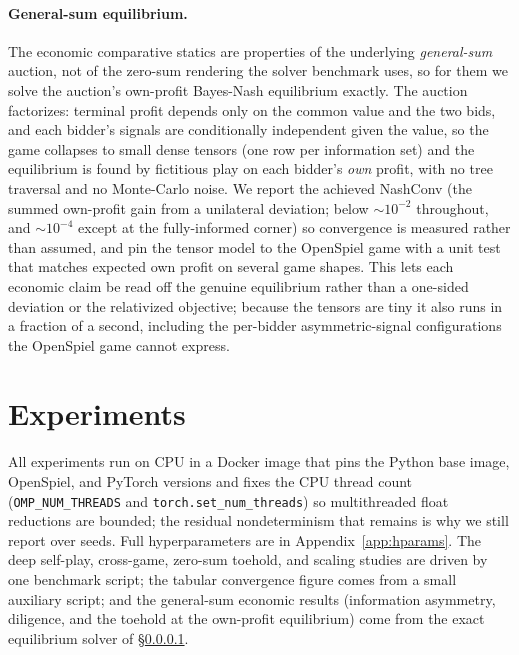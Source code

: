 \documentclass[11pt,a4paper]{article}
\begin{document}
\paragraph{General-sum equilibrium.}
\label{sec:methods-gs}
The economic comparative statics are properties of the underlying \emph{general-sum}
auction, not of the zero-sum rendering the solver benchmark uses, so for them we solve
the auction's own-profit Bayes-Nash equilibrium exactly. The auction factorizes:
terminal profit depends only on the common value and the two bids, and each bidder's
signals are conditionally independent given the value, so the game collapses to small
dense tensors (one row per information set) and the equilibrium is found by fictitious
play on each bidder's \emph{own} profit, with no tree traversal and no Monte-Carlo
noise. We report the achieved NashConv (the summed own-profit gain from a unilateral
deviation; below $\sim$$10^{-2}$ throughout, and $\sim$$10^{-4}$ except at the
fully-informed corner) so convergence is measured rather than assumed, and pin the
tensor model to the OpenSpiel game with a unit test that matches expected own profit on
several game shapes. This lets each economic claim be read off the genuine equilibrium
rather than a one-sided deviation or the relativized objective; because the tensors are
tiny it also runs in a fraction of a second, including the per-bidder asymmetric-signal
configurations the OpenSpiel game cannot express.

\section{Experiments}
\label{sec:experiments}

All experiments run on CPU in a Docker image that pins the Python base image,
OpenSpiel, and PyTorch versions and fixes the CPU thread count
(\texttt{OMP\_NUM\_THREADS} and \texttt{torch.set\_num\_threads}) so multithreaded
float reductions are bounded; the residual nondeterminism that remains is why we still
report over seeds. Full hyperparameters are in Appendix~\ref{app:hparams}. The
deep self-play, cross-game, zero-sum toehold, and scaling studies are driven by one
benchmark script; the tabular convergence figure comes from a small auxiliary script;
and the general-sum economic results (information asymmetry, diligence, and the toehold
at the own-profit equilibrium) come from the exact equilibrium solver of
\S\ref{sec:methods-gs}.
\end{document}
